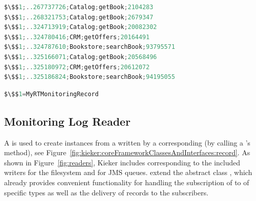 \begin{minipage}{\columnwidth}
\begin{lstlisting}[language=Java, numbers=none, xleftmargin=0pt, caption=Filesystem Monitoring Log with Monitoring Records of type MyRTMonitoringRecord, label=lst:RTMonitoringLog, basicstyle=\ttfamily\footnotesize]
$\$$1;..267737726;Catalog;getBook;2104283
$\$$1;..268321753;Catalog;getBook;2679347
$\$$1;..324713919;Catalog;getBook;20082302
$\$$1;..324780416;CRM;getOffers;20164491
$\$$1;..324787610;Bookstore;searchBook;93795571
$\$$1;..325166071;Catalog;getBook;20568496
$\$$1;..325180972;CRM;getOffers;20612072
$\$$1;..325186824;Bookstore;searchBook;94195055
\end{lstlisting}

\begin{lstlisting}[language=Java, numbers=none, xleftmargin=0pt, caption=Mapping of Monitoring Record type identifier to implementing class, label=lst:RTMonitoringLogMapping, basicstyle=\ttfamily\small]
$\$$1=MyRTMonitoringRecord
\end{lstlisting}
\end{minipage}

\subsection{Monitoring Log Reader}

\noindent A \MonitoringLogReader{} is used to create \MonitoringRecord{} instances from %
a \MonitoringLog{} written by a corresponding \MonitoringLogWriter{} (by
calling a \MonitoringRecord{}'s  method), see Figure~\ref{fig:kieker:coreFrameworkClassesAndInterfaces:record}. %
As shown in Figure~\ref{fig:readers}, %
Kieker includes \MonitoringLogReaders{} corresponding to the included writers %
for the filesystem and for JMS queues. %
\MonitoringLogReaders{} extend the abstract class ,
which already provides convenient functionality for handling the subscription of %
\MonitoringRecordConsumers{} to \MonitoringRecords{} of specific types as well as %
the delivery of records to the subscribers. %

